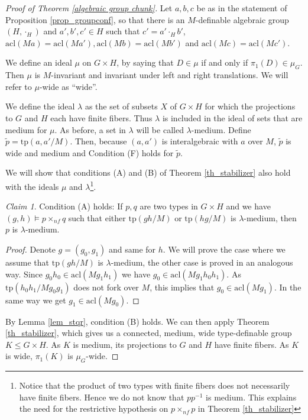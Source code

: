 \documentclass[12pt]{article}
\theoremstyle{definition}
\theoremstyle{mystyle}
\theoremstyle{remark}
\newtheorem*{claim}{Claim}
\newenvironment{claimproof}
    {\begin{proof}}{\renewcommand\qedsymbol{\Squarepipe} \end{proof}}
\newcommand{\acl}{\mathrm{acl}}
\newcommand{\tp}{\mathrm{tp}}
\begin{document}
\begin{proof}[Proof of Theorem \ref{algebraic group chunk}]

Let $a,b,c$ be as in the statement of Proposition \ref{prop_groupconf},
so that there is an $M$-definable algebraic group $(H, \cdot_H)$
and $a', b', c' \in H$ such that $c'= a'\cdot_H b'$, $\acl(Ma)=
\acl(Ma'), \acl(Mb)= \acl(Mb')$ and $\acl(Mc)= \acl(Mc')$.

We define an ideal $\mu$ on $G \times H$, by saying that $D\in
\mu$ if and only if $\pi_1(D)\in \mu_G$. Then $\mu$ is
$M$-invariant and invariant under left and right translations. We
will refer to $\mu$-wide as ``wide''.

We define the ideal $\lambda$ as the set of subsets $X$ of
$G\times H$ for which the projections to $G$ and $H$ each have
finite fibers. Thus $\lambda$ is included in the ideal of sets that are medium for $\mu$.
As before, a set in $\lambda$ will be called $\lambda$-medium.
Define $\widetilde{p}= \tp(a,a'/M)$. Then, because
$(a,a')$ is interalgebraic with $a$ over $M$, $\widetilde{p}$ is
wide and medium and Condition (F) holds for $\widetilde{p}$.

We will show that conditions (A) and (B) of Theorem
\ref{th_stabilizer} also hold with the ideals $\mu$ and
$\lambda$\footnote{Notice that the product of two types with
finite fibers does not necessarily have finite fibers.
Hence we do not know that $pp^{-1}$ is medium.
This explains the need for the restrictive hypothesis on $p\times_{nf} p$ in Theorem \ref{th_stabilizer}}.

\begin{claim}
Condition (A) holds: If $p,q$ are two types in $G\times H$ and we
have $(g,h)\models p\times_{nf} q$ such that either $\tp(gh/M)$ or
$\tp(hg/M)$ is $\lambda$-medium, then $p$ is $\lambda$-medium.
\end{claim}

\begin{claimproof}
Denote $g=(g_0,g_1)$ and same for $h$. We will prove the case
where we assume that $\tp(gh/M)$ is $\lambda$-medium, the other case is
proved in an analogous way. Since $g_0h_0 \in \acl(Mg_1h_1)$ we
have $g_0 \in \acl(Mg_1h_0h_1)$. As $\tp(h_0h_1/Mg_0g_1)$ does not
fork over $M$, this implies that $g_0 \in \acl(Mg_1)$. In the same
way we get $g_1 \in \acl(Mg_0)$.
 \end{claimproof}

By Lemma \ref{lem_stqr}, condition (B) holds. We can then apply
Theorem \ref{th_stabilizer}, which gives us a connected,  medium,
wide type-definable group $K\leq G\times H$. As $K$ is medium, its
projections to $G$ and $H$ have finite fibers. As $K$ is wide,
$\pi_1(K)$ is $\mu_G$-wide.


\end{proof}
\end{document}
